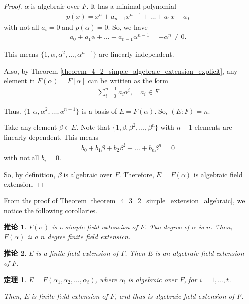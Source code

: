 \documentclass[utf8]{ctexbook}
\newtheorem{theorem}{定理}[section]
\newtheorem{corollary}{推论}[section]
\begin{document}
\begin{proof}
$\alpha$ is algebraic over $F$. It has a minimal polynomial
\begin{align*}
p(x) = x^n + a_{n-1} x^{n-1} + \ldots + a_1 x + a_0
\end{align*}
with not all $a_i = 0$ and $p(\alpha)=0$. So, we have
\begin{align*}
a_0 + a_1 \alpha + \ldots + a_{n-1} \alpha^{n-1} = - \alpha^n \neq 0 .
\end{align*}

This means $\{ 1, \alpha, \alpha^2, \ldots, \alpha^{n-1} \}$ are linearly independent.

Also, by Theorem \ref{theorem_4_2_simple_algebraic_extension_explicit}, any element in $F(\alpha) = F[\alpha]$ can be written as the form
\begin{align*}
\sum_{i=0} ^{n-1} a_i \alpha^i, \quad a_i \in F
\end{align*}

Thus, $\{ 1, \alpha, \alpha^2, \ldots, \alpha^{n-1} \}$  is a basis of $E = F(\alpha)$. So, $(E:F)=n$.

Take any element $\beta \in E$. Note that $\{ 1, \beta, \beta^2, \ldots, \beta^n \}$ with $n+1$ elements are linearly dependent. This means
\begin{align*}
b_0 + b_1 \beta + b_2 \beta^2 + \ldots + b_n \beta^n = 0
\end{align*}
with not all $b_i =0$.

So, by definition, $\beta$ is algebraic over $F$. Therefore, $E=F(\alpha)$ is algebraic field extension.

\end{proof}


From the proof of Theorem \ref{theorem_4_3_2_simple_extension_algebraic}, we notice the following corollaries.

\begin{corollary}\label{corollary_4_3_2_simple_extension_algebraic}
$F(\alpha)$ is a simple field extension of $F$. The degree of $\alpha$ is $n$. Then, $F(\alpha)$ is a $n$ degree finite field extension.
\end{corollary}

\begin{corollary}\label{corollary_4_3_3_simple_extension_algebraic}
$E$ is a finite field extension of $F$. Then $E$ is an algebraic field extension of $F$.
\end{corollary}


\begin{theorem}
\label{theorem_4_3_3_finite_extension_algebraic}
$E = F(\alpha_1, \alpha_2, \ldots, \alpha_t)$, where $\alpha_i$ is algebraic over $F$, for $i=1, \ldots, t$.

Then, $E$ is finite field extension of $F$, and thus is algebraic field extension of $F$.
\end{theorem}
\end{document}
